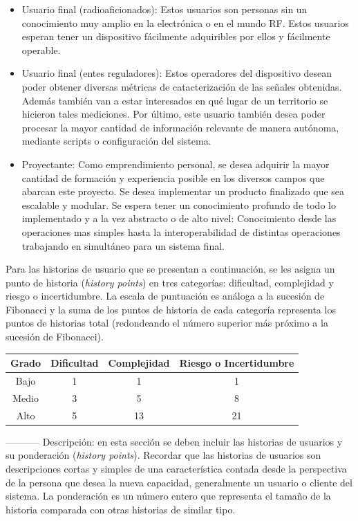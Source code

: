 \documentclass[
11pt, %
codirector, %
]{charter}
\begin{document}
\begin{itemize}
	\item Usuario final (radioaficionados): Estos usuarios son personas sin un conocimiento muy amplio en la electrónica o en el mundo RF. Estos usuarios esperan tener un dispositivo fácilmente adquiribles por ellos y fácilmente operable.
	\item Usuario final (entes reguladores): Estos operadores del dispositivo desean poder obtener diversas métricas de catacterización de las señales obtenidas. Además también van a estar interesados en qué lugar de un territorio se hicieron tales mediciones. Por último, este usuario también desea poder procesar la mayor cantidad de información relevante de manera autónoma, mediante scripts o configuración del sistema.
	\item Proyectante: Como emprendimiento personal, se desea adquirir la mayor cantidad de formación y experiencia posible en los diversos campos que abarcan este proyecto. Se desea implementar un producto finalizado que sea escalable y modular. Se espera tener un conocimiento profundo de todo lo implementado y a la vez abstracto o de alto nivel: Conocimiento desde las operaciones mas simples hasta la interoperabilidad de distintas operaciones trabajando en simultáneo para un sistema final.
\end{itemize}

Para las historias de usuario que se presentan a continuación, se les asigna un punto de historia (\textit{history points}) en tres categorías: dificultad, complejidad y riesgo o incertidumbre. La escala de puntuación es análoga a la sucesión de Fibonacci y la suma de los puntos de historia de cada categoría representa los puntos de historias total (redondeando el número superior más próximo a la sucesión de Fibonacci).


\begin{table}[h]
\centering
\begin{tabular}{|c|c|c|c|} 
\hline
\rowcolor[HTML]{C0C0C0} 
\textbf{Grado} & \textbf{Dificultad} & \textbf{Complejidad} & \textbf{Riesgo o Incertidumbre}\\
\hline
Bajo & 1 & 1 & 1\\ 
\hline
Medio & 3 & 5 & 8\\ 
\hline
Alto & 5 & 13 & 21\\ 
\hline
\end{tabular}
\end{table}

-----------
Descripción: en esta sección se deben incluir las historias de usuarios y su ponderación (\textit{history points}). Recordar que las historias de usuarios son descripciones cortas y simples de una característica contada desde la perspectiva de la persona que desea la nueva capacidad, generalmente un usuario o cliente del sistema. La ponderación es un número entero que representa el tamaño de la historia comparada con otras historias de similar tipo.
\end{document}
